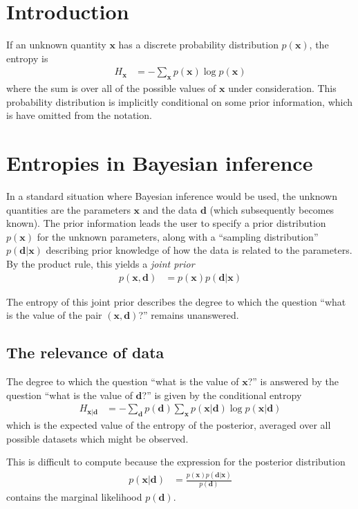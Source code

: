 \documentclass[journal,article,accept,moreauthors,pdftex,12pt,a4paper]{mdpi}
\renewcommand{\d}{\boldsymbol{d}}
\newcommand{\x}{\boldsymbol{x}}
\begin{document}

\section{Introduction}

If an unknown quantity $\x$ has a discrete probability distribution $p(\x)$,
the entropy is
\begin{align}
H_{\x} &= -\sum_{\x} p(\x) \log p(\x)
\end{align}
where the sum is over all of the possible values of $\x$ under consideration.
This probability distribution is implicitly conditional on some prior
information, which is have omitted from the notation.

\section{Entropies in Bayesian inference}

In a standard situation where Bayesian inference would be used,
the unknown quantities are the parameters $\x$ and the data $\d$
(which subsequently becomes known). The prior information leads the
user to specify a prior distribution $p(\x)$ for the unknown parameters,
along with a ``sampling distribution'' $p(\d | \x)$ describing prior knowledge
of how the data is related to the parameters. By the product rule, this yields
a {\em joint prior}
\begin{align}
p(\x, \d) &= p(\x)p(\d | \x)
\end{align}


The entropy of this joint prior describes the degree to which the question
``what is the value of the pair $(\x, \d)$?'' remains unanswered.

\subsection{The relevance of data}

The degree to which the question ``what is the value of $\x$?'' is
answered by the question ``what is the value of $\d$?'' is given by the
conditional entropy
\begin{align}
H_{\x | \d} &= - \sum_{\d} p(\d) \sum_{\x} p(\x | \d) \log p(\x | \d)
\end{align}
which is the expected value of the entropy of the posterior, averaged over
all possible datasets which might be observed.

This is difficult to compute because the expression
for the posterior distribution
\begin{align}
p(\x | \d) &= \frac{p(\x)p(\d | \x)}{p(\d)}
\end{align}
contains the marginal likelihood $p(\d)$.
\end{document}
